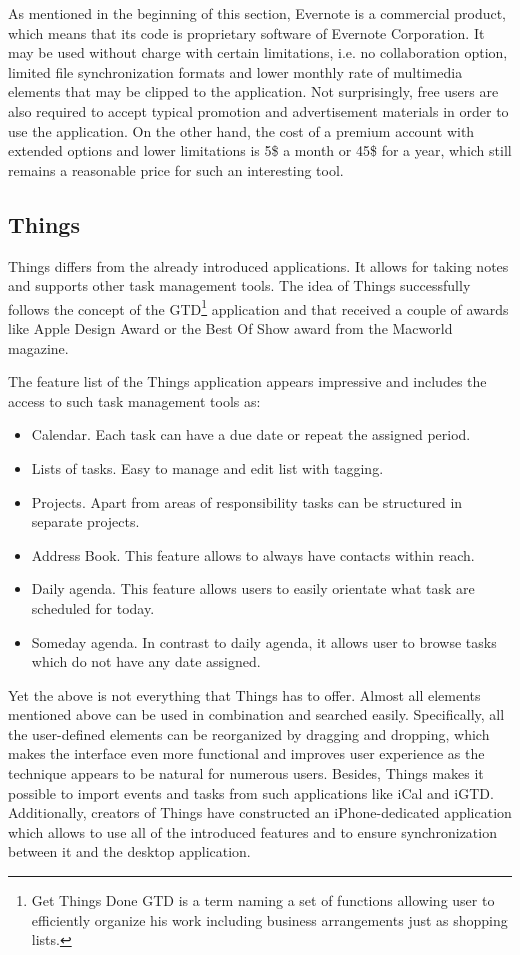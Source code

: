 As mentioned in the beginning of this section, Evernote is a commercial product, which means that its code is proprietary software of Evernote Corporation. It may be used without charge with certain limitations, i.e. no collaboration option, limited file synchronization formats and lower monthly rate of multimedia elements that may be clipped to the application. Not surprisingly, free users are also required to accept typical promotion and advertisement materials in order to use the application. On the other hand, the cost of a premium account with extended options and lower limitations is 5\$ a month or 45\$ for a year, which still remains a reasonable price for such an interesting tool. 

\subsection{Things}\label{subsec:things} 
Things differs from the already introduced applications. It allows for taking notes and supports other task management tools. The idea of Things successfully follows the concept of the GTD\footnote{Get Things Done GTD is a term naming a set of functions allowing user to efficiently organize his work including business arrangements just as shopping lists.} application and that received a couple of awards like Apple Design Award or the Best Of Show award from the Macworld magazine. 
 
The feature list of the Things application appears impressive and includes the access to such task management tools as:
 \begin{itemize}
 \item{Calendar. Each task can have a due date or repeat the assigned period.}
 \item{Lists of tasks. Easy to manage and edit list with tagging.}
 \item{Projects. Apart from areas of responsibility tasks can be structured in separate projects.}
 \item{Address Book. This feature allows to always have contacts within reach.}
 \item{Daily agenda. This feature allows users to easily orientate what task are scheduled for today.}
 \item{Someday agenda. In contrast to daily agenda, it allows user to browse tasks which do not have any date assigned.}
 \end{itemize}
Yet the above is not everything that Things has to offer. Almost all elements mentioned above can be used in combination and searched easily. Specifically, all the user-defined elements can be reorganized by dragging and dropping, which makes the interface even more functional and improves user experience as the technique appears to be natural for numerous users. Besides, Things makes it possible to import events and tasks from such applications like iCal and iGTD. Additionally, creators of Things have constructed an iPhone-dedicated application which allows to use all of the introduced features and to ensure synchronization between it and the desktop application. 

